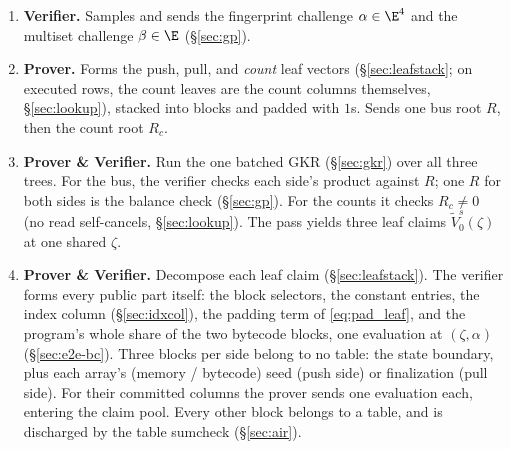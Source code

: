 \begin{enumerate}
\item \textbf{Verifier.} Samples and sends the fingerprint challenge $\alpha\in\E^{4}$ and the multiset challenge $\beta\in\E$ (\S\ref{sec:gp}).
\item \textbf{Prover.} Forms the push, pull, and \emph{count} leaf vectors (\S\ref{sec:leafstack}; on executed rows, the count leaves are the count columns themselves, \S\ref{sec:lookup}), stacked into blocks and padded with $1$s. Sends one bus root $R$, then the count root $R_c$.
\item \textbf{Prover \& Verifier.} Run the one batched GKR (\S\ref{sec:gkr}) over all three trees. For the bus, the verifier checks each side's product against $R$; one $R$ for both sides is the balance check (\S\ref{sec:gp}). For the counts it checks $R_c\neq0$ (no read self-cancels, \S\ref{sec:lookup}). The pass yields three leaf claims $\widetilde V^{s}_0(\zeta)$ at one shared $\zeta$.
\item \textbf{Prover \& Verifier.} Decompose each leaf claim (\S\ref{sec:leafstack}). The verifier forms every public part itself: the block selectors, the constant entries, the index column (\S\ref{sec:idxcol}), the padding term of \eqref{eq:pad_leaf}, and the program's whole share of the two bytecode blocks, one evaluation at $(\zeta,\alpha)$ (\S\ref{sec:e2e-bc}). Three blocks per side belong to no table: the state boundary, plus each array's (memory / bytecode) seed (push side) or finalization (pull side). For their committed columns the prover sends one evaluation each, entering the claim pool. Every other block belongs to a table, and is discharged by the table sumcheck (\S\ref{sec:air}).
\end{enumerate}

